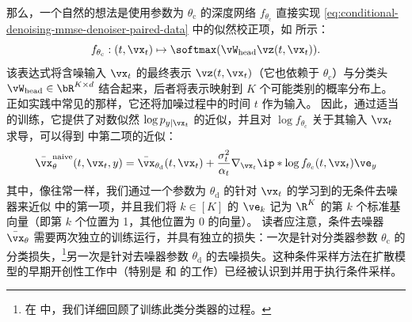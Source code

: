 \documentclass[../../book-main_zh.tex]{subfiles}
\begin{document}
那么，一个自然的想法是使用参数为 $\theta_{\mathrm{c}}$ 的深度网络 $f_{\theta_{\mathrm{c}}}$ 直接实现
\eqref{eq:conditional-denoising-mmse-denoiser-paired-data} 中的似然校正项，如
 所示：
\begin{equation}
    f_{\theta_{\mathrm{c}}} : (t, \vx_t) \mapsto \softmax(\vW_{\mathrm{head}}
    \vz(t, \vx_t)).
\end{equation}
该表达式将含噪输入 $\vx_t$ 的最终表示 $\vz(t, \vx_t)$（它也依赖于
$\theta_{\mathrm{c}}$）与分类头 $\vW_{\mathrm{head}} \in \bR^{K
\times d}$ 结合起来，后者将表示映射到 $K$ 个可能类别的概率分布上。
正如实践中常见的那样，它还将加噪过程中的时间 $t$ 作为输入。
因此，通过适当的训练，它提供了对数似然
$\log p_{y \mid \vx_t}$ 的近似，并且对 $\log f_{\theta_{\mathrm{c}}}$ 关于其输入 $\vx_t$ 求导，可以得到
 中第二项的近似：
\begin{equation}\label{eq:conditional-denoising-mmse-denoiser-paired-data-approx}
    \bar{\vx}_{\theta}^{\mathrm{naive}}(t, \vx_t, y)
    =
    \bar{\vx}_{\theta_{\mathrm{d}}}(t, \vx_t)
    + \frac{\sigma_t^2}{\alpha_t}
    \nabla_{\vx_t}
    \ip*{
        \log f_{\theta_{\mathrm{c}}}(t, \vx_t)
    }{
        \ve_{y}
    }
\end{equation}
其中，像往常一样，我们通过一个参数为 $\theta_{\mathrm{d}}$ 的针对 $\vx_t$ 的学习到的无条件去噪器来近似
 中的第一项，并且我们将 $k \in [K]$ 的 $\ve_k$ 记为 $\R^K$ 的第 $k$ 个标准基向量（即第 $k$ 个位置为 1，其他位置为 0 的向量）。
读者应注意，条件去噪器 $\bar{\vx}_{\theta}$ 需要两次独立的训练运行，并具有独立的损失：一次是针对分类器参数 $\theta_{\mathrm{c}}$ 的分类损失，\footnote{在  中，我们详细回顾了训练此类分类器的过程。}另一次是针对去噪器参数
$\theta_{\mathrm{d}}$ 的去噪损失。这种条件采样方法在扩散模型的早期开创性工作中（特别是
\citet{Sohl-Dickstein2015} 和 \citet{song2020score} 的工作）已经被认识到并用于执行条件采样。
\end{document}
